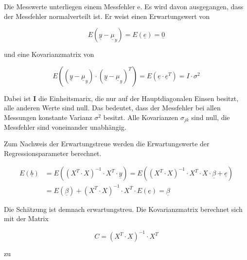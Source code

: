 \noindent Die Messwerte unterliegen einem Messfehler e. Es wird davon ausgegangen, dass der Messfehler normalverteilt ist. Er weist einen Erwartungswert von 

\begin{equation}\label{eq:thirteenthirtyfour}
E\left(\underline{y}-\underline{\mu }_{y} \right)=E\left(\underline{e}\right)=\underline{0}
\end{equation}

\noindent und eine Kovarianzmatrix von

\begin{equation}\label{eq:thirteenthirtyfive}
E\left(\left(\underline{y}-\underline{\mu }_{y} \right)\cdot \left(\underline{y}-\underline{\mu }_{y} \right)^{T} \right)=E\left(\underline{e}\cdot \underline{e}^{T} \right)=I\cdot \sigma ^{2}
\end{equation}

\noindent Dabei ist \textbf{I} die Einheitsmarix, die nur auf der Hauptdiagonalen Einsen besitzt, alle anderen Werte sind null. Das bedeutet, dass der Messfehler bei allen Messungen konstante Varianz $\sigma^{2}$ besitzt. Alle Kovarianzen $\sigma_{jk}$ sind null, die Messfehler sind voneinander unabh\"{a}ngig. \newline

\noindent Zum Nachweis der Erwartungstreue werden die Erwartungswerte der Regressionsparameter berechnet. 

\begin{equation}\label{eq:thirteenthirtysix}
\begin{split}
E\left(\underline{b}\right) & =E\left(\left(X^{T} \cdot X\right)^{-1} \cdot X^{T} \cdot \underline{y}\right)=E\left(\left(X^{T} \cdot X\right)^{-1} \cdot X^{T} \cdot X\cdot \underline{\beta }+\underline{e}\right) \\ 
& = E\left(\underline{\beta }\right)+\left(X^{T} \cdot X\right)^{-1} \cdot X^{T} \cdot E\left(\underline{e}\right)=\underline{\beta }
\end{split}
\end{equation}

\noindent Die Sch\"{a}tzung ist demnach erwartungstreu. Die Kovarianzmatrix berechnet sich mit der Matrix

\begin{equation}\label{eq:thirteenthirtyseven}
C=\left(X^{T} \cdot X\right)^{-1} \cdot X^{T}
\end{equation}

\noindent zu

